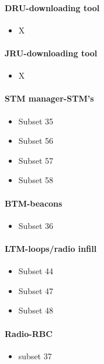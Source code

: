 \documentclass{template/openetcs_article}
\begin{document}
\paragraph{DRU-downloading tool}
\begin{itemize}
\item  X
\end{itemize}

\paragraph{JRU-downloading tool}
\begin{itemize}
\item X
\end{itemize}

\paragraph{STM manager-STM{\textquoteright}s}
\begin{itemize}
\item Subset 35
\item Subset 56
\item Subset 57
\item Subset 58
\end{itemize}

\paragraph{BTM-beacons}
\begin{itemize}
\item Subset 36
\end{itemize}

\paragraph{LTM-loops/radio infill}
\begin{itemize}
\item Subset 44
\item Subset 47
\item Subset 48
\end{itemize}

\paragraph{Radio-RBC}
\begin{itemize}
\item subset 37
\end{itemize}
\end{document}
